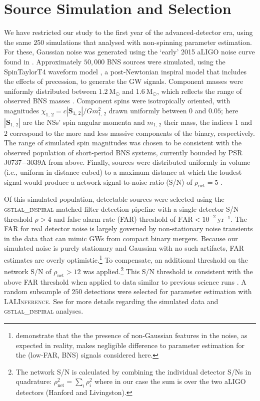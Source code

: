 \section{Source Simulation and Selection}\label{sec:sources}

We have restricted our study to the first year of the advanced-detector era, using the same $250$ simulations that \citet{Singer_2014} analysed with non-spinning parameter estimation. For these, Gaussian noise was generated using the `early' 2015 aLIGO noise curve found in \citet{Barsotti:2012}. Approximately $50,000$ BNS sources were simulated, using the SpinTaylorT4 waveform model \citep{Buonanno_2003,Buonanno_2009}, a post-Newtonian inspiral model that includes the effects of precession, to generate the GW signals. Component masses were uniformly distributed between $1.2~\mathrm{M}_\odot$ and $1.6~\mathrm{M}_\odot$, which reflects the range of observed BNS masses \citep{_zel_2012}. Component spins were isotropically oriented, with magnitudes $\chi_{1,\,2} = c |\mathbf{S}_{1,\,2}|/G m_{1,\,2}^2$ drawn uniformly between $0$ and $0.05$; here $|\mathbf{S}_{1,\,2}|$ are the NSs' spin angular momenta and $m_{1,\,2}$ their mass, the indices $1$ and $2$ correspond to the more and less massive components of the binary, respectively.  The range of simulated spin magnitudes was chosen to be consistent with the observed population of short-period BNS systems, currently bounded by PSR J0737$-$3039A \citep{Burgay_2003,Brown_2012} from above.  Finally, sources were distributed uniformly in volume (i.e., uniform in distance cubed) to a maximum distance at which the loudest signal would produce a network signal-to-noise ratio (S/N) of $\rho_\mathrm{net} = 5$ \citep{Singer_2014}.

Of this simulated population, detectable sources were selected using the \textsc{gstlal\_inspiral} matched-filter detection pipeline \citep{Cannon_2012} with a single-detector S/N threshold $\rho>4$ and false alarm rate (FAR) threshold of $\mathrm{FAR}<10^{-2}~\mathrm{yr}^{-1}$.  The FAR for real detector noise is largely governed by non-stationary noise transients in the data that can mimic GWs from compact binary mergers.  Because our simulated noise is purely stationary and Gaussian with no such artifacts, FAR estimates are overly optimistic.\footnote{\citet{Berry_2014} demonstrate that the the presence of non-Gaussian features in the noise, as expected in reality, makes negligible difference to parameter estimation for the (low-FAR, BNS) signals considered here.} To compensate, an additional threshold on the network S/N of $\rho_\mathrm{net} > 12$ was applied.\footnote{The network S/N is calculated by combining the individual detector S/Ns in quadrature: $\rho_\mathrm{net}^2 = \sum_i \rho_i^2$ where in our case the sum is over the two aLIGO detectors (Hanford and Livingston).} This S/N threshold is consistent with the above FAR threshold when applied to data similar to previous science runs \cite{2013arXiv1304.0670L,Berry_2014}. A random subsample of $250$ detections were selected for parameter estimation with \textsc{LALInference}. See \citet{Singer_2014} for more details regarding the simulated data and \textsc{gstlal\_inspiral} analyses.
  
  
  
  
  
  
  
  
  
  